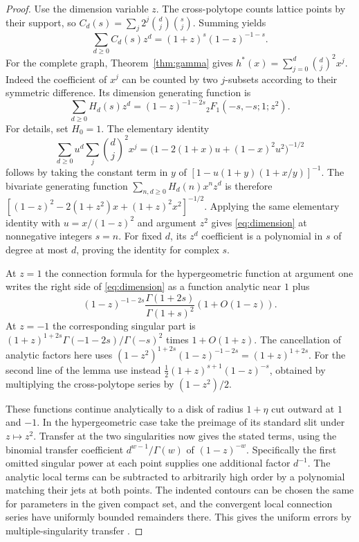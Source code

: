 \begin{proof}
Use the dimension variable $z$. The cross-polytope counts lattice points
by their support, so $C_d(s)=\sum_j 2^j\binom dj\binom sj$. Summing
yields
\[
 \sum_{d\ge0} C_d(s)z^d=(1+z)^s(1-z)^{-1-s}.
\]
For the complete graph, Theorem~\ref{thm:gamma} gives
$h^*(x)=\sum_{j=0}^d\binom dj^2 x^j$. Indeed the coefficient of $x^j$
can be counted by two $j$-subsets according to their symmetric
difference. Its dimension generating function is
\begin{equation}\label{eq:dimension}
 \sum_{d\ge0}H_d(s)z^d=(1-z)^{-1-2s}
       {}_2F_1(-s,-s;1;z^2).
\end{equation}
For details, set $H_0=1$. The elementary identity
\[
 \sum_{d\ge0} u^d\sum_j\binom dj^2 x^j
 =\big(1-2(1+x)u+(1-x)^2u^2\big)^{-1/2}
\]
follows by taking the constant term in $y$ of
$[1-u(1+y)(1+x/y)]^{-1}$. The bivariate generating function
$\sum_{n,d\ge0}H_d(n)x^nz^d$ is therefore
$[(1-z)^2-2(1+z^2)x+(1+z)^2x^2]^{-1/2}$.
Applying the same elementary identity with $u=x/(1-z)^2$ and
argument $z^2$ gives \eqref{eq:dimension} at nonnegative integers $s=n$.
For fixed $d$, its $z^d$ coefficient is a polynomial in $s$ of degree
at most $d$, proving the identity for complex $s$.

At $z=1$ the connection formula for the hypergeometric function at argument one
\cite[Eq.~15.8.4]{dlmf} writes the right side of
\eqref{eq:dimension} as a function analytic near $1$ plus
\[
 (1-z)^{-1-2s}\frac{\Gamma(1+2s)}{\Gamma(1+s)^2}
 (1+O(1-z)).
\]
At $z=-1$ the corresponding singular part is
$(1+z)^{1+2s}\Gamma(-1-2s)/\Gamma(-s)^2$ times
$1+O(1+z)$. The cancellation of analytic factors here uses
$(1-z^2)^{1+2s}(1-z)^{-1-2s}=(1+z)^{1+2s}$.
For the second line of the lemma use instead
$\tfrac12(1+z)^{s+1}(1-z)^{-s}$, obtained by multiplying the
cross-polytope series by $(1-z^2)/2$.

These functions continue analytically to a disk of radius $1+\eta$
cut outward at $1$ and $-1$. In the hypergeometric case take the
preimage of its standard slit under $z\mapsto z^2$. Transfer at the two
singularities now gives the stated terms, using the binomial transfer
coefficient $d^{w-1}/\Gamma(w)$ of $(1-z)^{-w}$.
Specifically the first omitted singular power at each point supplies
one additional factor $d^{-1}$. The analytic local terms can be
subtracted to arbitrarily high order by a polynomial matching their
jets at both points. The indented contours can be chosen the same for
parameters in the given compact set, and the convergent local
connection series have uniformly bounded remainders there. This gives
the uniform errors by multiple-singularity transfer
\cite[Ch.~VI]{fs}.
\end{proof}

